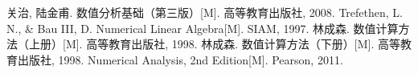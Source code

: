 \begin{thebibliography}{99}
     关治, 陆金甫. 数值分析基础（第三版）[M]. 高等教育出版社, 2008.
     Trefethen, L. N., \& Bau III, D. Numerical Linear Algebra[M]. SIAM, 1997.
     林成森. 数值计算方法（上册）[M]. 高等教育出版社, 1998.
     林成森. 数值计算方法（下册）[M]. 高等教育出版社, 1998.
     Numerical Analysis, 2nd Edition[M]. Pearson, 2011.
\end{thebibliography}
